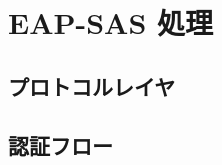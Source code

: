 \section{EAP-SAS 処理}
\toc
\subsection{プロトコルレイヤ}
\begin{frame}{\ft}
    
\end{frame}
\subsection{認証フロー}
\begin{frame}{\ft}
    
\end{frame}